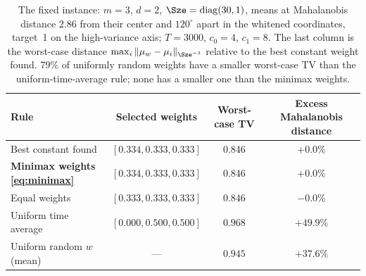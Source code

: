 \begin{table}[t]
\centering
\small
\begin{tabular}{lccc}
\toprule
Rule & Selected weights & Worst-case TV & Excess Mahalanobis distance \\
\midrule
Best constant found & $[0.334, 0.333, 0.333]$ & $0.846$ & $+0.0\%$ \\
\textbf{Minimax weights \eqref{eq:minimax}} & $[0.334, 0.333, 0.333]$ & $0.846$ & $+0.0\%$ \\
Equal weights & $[0.333, 0.333, 0.333]$ & $0.846$ & $-0.0\%$ \\
Uniform time average & $[0.000, 0.500, 0.500]$ & $0.968$ & $+49.9\%$ \\
Uniform random $w$ (mean) & --- & $0.945$ & $+37.6\%$ \\
\bottomrule
\end{tabular}
\caption{The fixed instance: $m=3$, $d=2$, $\Sze=\mathrm{diag}(30,1)$, means at Mahalanobis distance $2.86$ from their center and $120^\circ$ apart in the whitened coordinates, target~1 on the high-variance axis; $T=3000$, $c_0=4$, $c_1=8$. The last column is the worst-case distance $\max_i\|\mu_w-\mu_i\|_{\Sze^{-1}}$ relative to the best constant weight found. 79\% of uniformly random weights have a smaller worst-case TV than the uniform-time-average rule; none has a smaller one than the minimax weights.}
\label{tab:metric}
\end{table}
